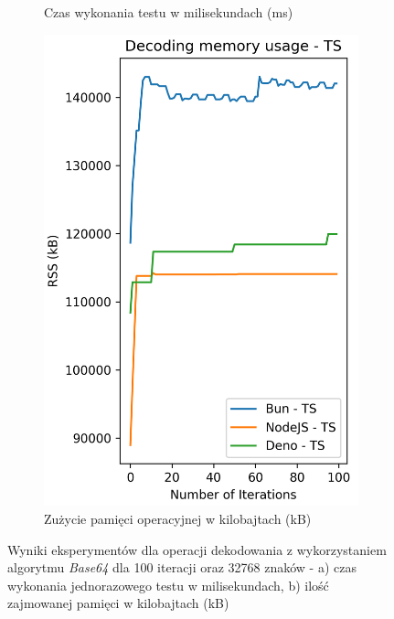 \begin{figure}[H]
\begin{subfigure}[b]{0.42\textwidth}
    \caption{Czas wykonania testu w milisekundach (ms)}
    \label{fig:decoding_e1_ts_time}
  \end{subfigure}
  \begin{subfigure}[b]{0.42\textwidth}
    \centering
    \includegraphics[width=\textwidth]{Figures/coding/base64_100_decoding_ts_memory.png}
    \caption{Zużycie pamięci operacyjnej w kilobajtach (kB)}
    \label{fig:decoding_e1_ts_memory}
  \end{subfigure}
  \hfill
  \caption{Wyniki eksperymentów dla operacji dekodowania z wykorzystaniem algorytmu \textit{Base64} dla 100 iteracji oraz 32768 znaków - a) czas wykonania jednorazowego testu w milisekundach, b) ilość zajmowanej pamięci w kilobajtach (kB)}
  \label{fig:decoding_e1_ts}
\end{figure}

